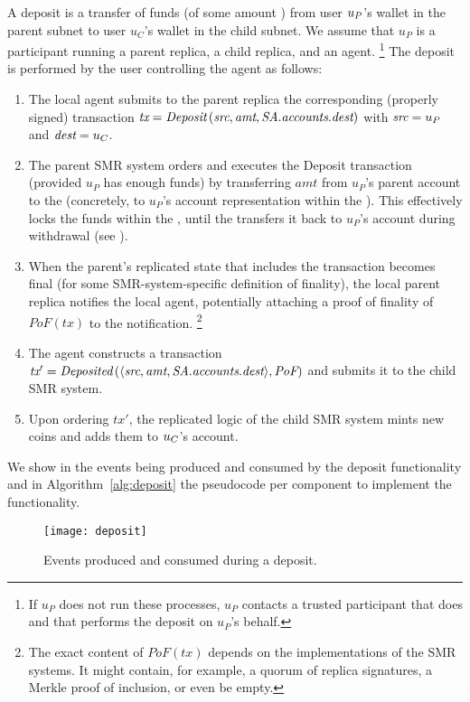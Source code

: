 A deposit is a transfer of funds (of some amount \fil) from user $u_P$'s wallet in the parent subnet to user $u_C$'s wallet in the child subnet.
We assume that $u_P$ is a participant running a parent replica, a child replica, and an \ipc agent.%
\footnote{If $u_P$ does not run these processes, $u_P$ contacts a trusted participant that does and that performs the deposit on $u_P$'s behalf.}
The deposit is performed by the user controlling the \ipc agent as follows:
\begin{enumerate}
    \item The local \ipc agent submits to the parent \smr replica the corresponding (properly signed) transaction
    $\textit{tx}=\textit{Deposit}\left( \textit{src}, \textit{amt}, \textit{SA}.\textit{accounts}.\textit{dest} \right)$ with $\textit{src}=u_P$ and $\textit{dest} = u_C$.
    \item The parent SMR system orders and executes the Deposit transaction (provided $u_P$ has enough funds) by transferring $amt$ from $u_P$'s parent account to the \sa (concretely, to $u_P$'s account representation within the \sa). This effectively locks the funds within the \sa \dapp, until the \sa \dapp transfers it back to $u_P$'s account during withdrawal (see ).
    \item When the parent's replicated state that includes the transaction becomes final (for some SMR-system-specific definition of finality), the local parent replica notifies the local \ipc agent, potentially attaching a proof of finality of $PoF(tx)$ to the notification.%
    \footnote{The exact content of $PoF(tx)$ depends on the implementations of the SMR systems. It might contain, for example, a quorum of replica signatures, a Merkle proof of inclusion, or even be empty.}
    \item The \ipc agent constructs a transaction $\textit{tx}' = \textit{Deposited}\left(\langle  \textit{src}, \textit{amt}, \textit{SA}.\textit{accounts}.\textit{dest} \rangle, \textit{PoF} \right)$ and submits it to the child SMR system.
    \item Upon ordering $tx'$, the replicated logic of the child SMR system mints \fil new coins and adds them to $u_C$'s account.
\end{enumerate}

We show in  the events being produced and consumed by the deposit functionality and in Algorithm~\ref{alg:deposit} the pseudocode per component to implement the functionality.

\begin{figure}[h]
     \centering
     \texttt{[image: deposit]}
     \caption{Events produced and consumed during a deposit.}
     \label{fig:deposit}
\end{figure}
 

